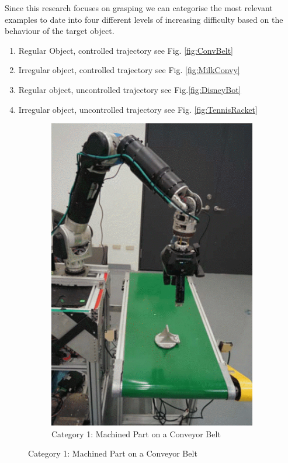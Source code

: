 Since this research focuses on grasping we can categorise the most relevant examples to date into four different levels of increasing difficulty based on the behaviour of the target object.

\begin{enumerate}
    \item Regular Object, controlled trajectory see Fig. \ref{fig:ConvBelt}
    \item Irregular object, controlled trajectory see Fig. \ref{fig:MilkConvy}
    \item Regular object, uncontrolled trajectory see Fig.\ref{fig:DisneyBot}
    \item Irregular object, uncontrolled trajectory see Fig. \ref{fig:TennisRacket} 
\end{enumerate}

\begin{figure}
    \centering
    \begin{subfigure}{.4\linewidth}
        \centering
        \includegraphics[width=.8\textwidth]{Images/ConveyorBelt.png}
        \caption[Category 1: Machined Part on a Conveyor Belt]{Category 1: Machined Part on a Conveyor Belt \cite{ConveyorBeltTracking}}

\end{subfigure}
\end{figure}
